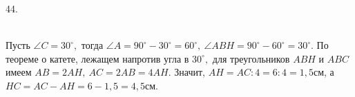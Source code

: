 44. \begin{figure}[ht!]
\end{figure}\\
Пусть $\angle C=30^\circ,$ тогда $\angle A=90^\circ-30^\circ=60^\circ,\ \angle ABH=90^\circ-60^\circ=30^\circ.$ По теореме о катете, лежащем напротив угла в $30^\circ,$ для треугольников $ABH$ и $ABC$ имеем $AB=2AH,\ AC=2AB=4AH.$ Значит, $AH=AC:4=6:4=1,5$см, а $HC=AC-AH=6-1,5=4,5$см.\\

